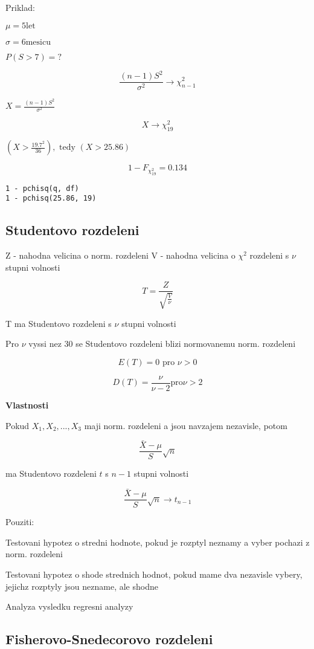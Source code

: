 \documentclass{article}
\begin{document}
Priklad:

$\mu = 5 \text{let}$

$\sigma = 6 \text{mesicu}$

$P(S > 7) = ?$

\[ \frac{(n-1) S^2}{\sigma^2} \rightarrow \chi^2_{n-1} \]

$X = \frac{(n-1)S^2}{\sigma^2}$

\[ X \rightarrow \chi_{19}^2 \]

$(X > \frac{19.7^2}{36}), \text{ tedy } (X > 25.86)$

\[ 1 - F_{\chi_{19}^2} = 0.134 \]

\begin{verbatim}
1 - pchisq(q, df)
1 - pchisq(25.86, 19)
\end{verbatim}

\subsection{Studentovo rozdeleni}

Z - nahodna velicina o norm. rozdeleni
V - nahodna velicina o $\chi^2$ rozdeleni s $\nu$ stupni volnosti

\[ T = \frac{Z}{\sqrt{\frac{V} {\nu}}} \]

T ma Studentovo rozdeleni s $\nu$ stupni volnosti

Pro $\nu$ vyssi nez 30 se Studentovo rozdeleni blizi normovanemu norm. rozdeleni

\[E(T) = 0 \text{ pro } \nu > 0\]

\[D(T) = \frac{\nu}{\nu - 2} \text{pro} \nu > 2 \]

\textbf{Vlastnosti}

Pokud $X_1, X_2, ..., X_3$ maji norm. rozdeleni a jsou navzajem nezavisle, potom

\[ \frac{\bar{X} - \mu} {S} \sqrt{n} \]

ma Studentovo rozdeleni $t$ s $n-1$ stupni volnosti

\[ \frac{\bar{X} - \mu} {S} \sqrt{n} \rightarrow t_{n-1} \]

Pouziti:

Testovani hypotez o stredni hodnote, pokud je rozptyl neznamy
a vyber pochazi z norm. rozdeleni

Testovani hypotez o shode strednich hodnot, pokud mame dva nezavisle vybery, jejichz
rozptyly jsou nezname, ale shodne

Analyza vysledku regresni analyzy

\subsection{Fisherovo-Snedecorovo rozdeleni}
\end{document}
